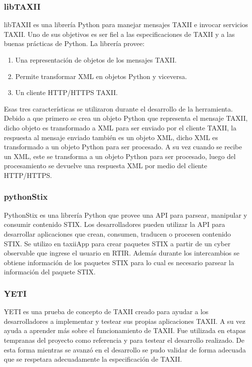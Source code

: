 \subsubsection{libTAXII}
libTAXII \cite{libtaxii} es una librería Python para manejar mensajes TAXII e invocar servicios TAXII. Uno de sus objetivos es ser fiel a las especificaciones de TAXII y a las buenas prácticas de Python.
La librería provee:

\begin{enumerate}
	\item
	Una representación de objetos de los mensajes TAXII.
	\item
	Permite transformar XML en objetos Python y viceversa.
	\item
	Un cliente HTTP/HTTPS TAXII.
\end{enumerate}

Esas tres características se utilizaron durante el desarrollo de la herramienta. Debido a que primero se crea un objeto Python que representa el mensaje TAXII, dicho objeto es transformado a XML para ser enviado por el cliente TAXII, la respuesta al mensaje enviado también es un objeto XML, dicho XML es transformado a un objeto Python para ser procesado.
A su vez cuando se recibe un XML, este se transforma a un objeto Python para ser procesado, luego del procesamiento se devuelve una respuesta XML por medio del cliente HTTP/HTTPS.

\subsubsection{pythonStix}
PythonStix \cite{pythonstixgit} es una librería Python que provee una API para parsear, manipular y consumir contenido STIX. Los desarrolladores pueden utilizar la API para desarrollar aplicaciones que crean, consumen, traducen o procesen contenido STIX.
Se utilizo en taxiiApp para crear paquetes STIX a partir de un cyber observable que ingrese el usuario en RTIR. Además durante los intercambios se obtiene información de los paquetes STIX para lo cual es necesario parsear la información del paquete STIX. 


\subsubsection{YETI}
YETI \cite{yeti} es una prueba de concepto de TAXII creado para ayudar a los desarrolladores a implementar y testear sus propias aplicaciones TAXII. A su vez ayuda a aprender más sobre el funcionamiento de TAXII.
Fue utilizada en etapas tempranas del proyecto como referencia y para testear el desarrollo realizado. De esta forma mientras se avanzó en el desarrollo se pudo validar de forma adecuada que se respetara adecuadamente la especificación de TAXII.


